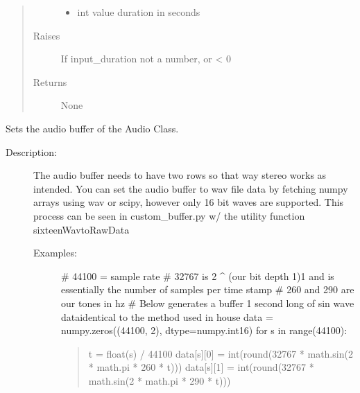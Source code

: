 \documentclass[letterpaper,10pt,english]{sphinxmanual}
\begin{document}
\begin{fulllineitems}
\begin{fulllineitems}
\begin{quote}
\begin{description}
\begin{itemize}
\item {} 
\sphinxAtStartPar
{} \textendash{} int value \sphinxhyphen{} duration in seconds

\end{itemize}

\item[{Raises}] \leavevmode
\sphinxAtStartPar
{} \textendash{} If input\_duration not a number, or \textless{} 0

\item[{Returns}] \leavevmode
\sphinxAtStartPar
None

\end{description}\end{quote}

\end{fulllineitems}


\begin{fulllineitems}
\label{\detokenize{dpav:dpav.audio.Audio.set_audio_buffer}}
\sphinxAtStartPar
Sets the audio buffer of the Audio Class.
\begin{description}
\item[{Description:}] \leavevmode
\sphinxAtStartPar
The audio buffer needs to have two rows so that way stereo works as intended.
You can set the audio buffer to wav file data by fetching numpy arrays using wav or scipy,
however only 16 bit waves are supported. This process can be seen in custom\_buffer.py w/ the
utility function sixteenWavtoRawData
\begin{description}
\item[{Examples:}] \leavevmode
\sphinxAtStartPar
\# 44100 = sample rate
\# 32767 is 2 \textasciicircum{} (our bit depth \sphinxhyphen{}1)\sphinxhyphen{}1 and is essentially the number of samples per time stamp
\# 260 and 290 are our tones in hz
\# Below generates a buffer 1 second long of sin wave data\sphinxhyphen{}identical to the method used in house
data = numpy.zeros((44100, 2), dtype=numpy.int16)
for s in range(44100):
\begin{quote}

\sphinxAtStartPar
t = float(s) / 44100
data{[}s{]}{[}0{]} = int(round(32767 * math.sin(2 * math.pi * 260 * t)))
data{[}s{]}{[}1{]} = int(round(32767 * math.sin(2 * math.pi * 290 * t)))
\end{quote}


\end{description}
\end{description}
\end{fulllineitems}
\end{fulllineitems}
\end{document}
